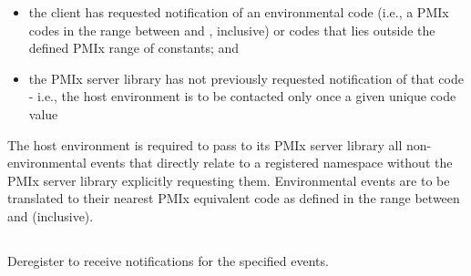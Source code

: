 \begin{itemize}
    \item the client has requested notification of an environmental code (i.e., a \ac{PMIx} codes in the range between  and , inclusive) or codes that lies outside the defined \ac{PMIx} range of constants; and
    \item the \ac{PMIx} server library has not previously requested notification of that code - i.e., the host environment is to be contacted only once a given unique code value
\end{itemize}

\adviceimplend

\advicermstart
The host environment is required to pass to its \ac{PMIx} server library all non-environmental events that directly relate to a registered namespace without the \ac{PMIx} server library explicitly requesting them. Environmental events are to be translated to their nearest \ac{PMIx} equivalent code as defined in the range between  and  (inclusive).
\advicermend


\subsection{}

\summary

Deregister to receive notifications for the specified events.

\format


\begin{arglist}
\end{arglist}

